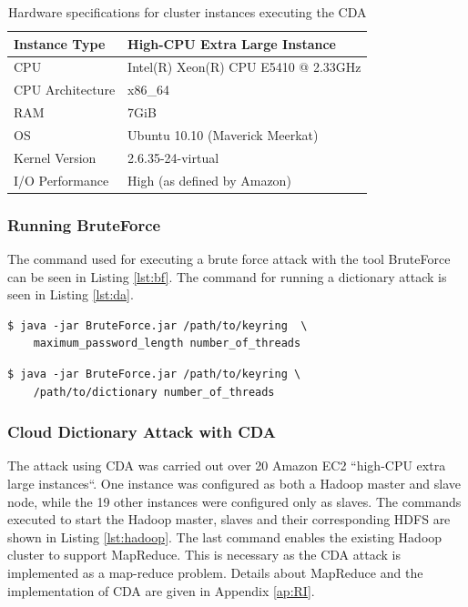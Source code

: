 \documentclass[pdftex,english,10pt,b5paper,twoside]{book}
\begin{document}
\begin{table}[!h]
    \centering
    \caption{Hardware specifications for cluster instances executing the
    \ac{CDA}}
    \label{tab:hwcda}
    \begin{tabular}{| l | l |}
	\hline
	Instance Type       &High-CPU Extra Large Instance\\
	\hline
	CPU		            &Intel(R) Xeon(R) CPU E5410 @ 2.33GHz\\
	\hline
	CPU Architecture    &x86\_64\\
	\hline
	RAM		            &7GiB\\
	\hline
	OS		            &Ubuntu 10.10 (Maverick Meerkat)\\
	\hline
	Kernel Version	    &2.6.35-24-virtual\\
	\hline
	I/O Performance	    &High (as defined by Amazon)\\
	\hline
    \end{tabular}
\end{table}

\subsubsection{Running BruteForce}
The command used for executing a brute force attack with the tool BruteForce
can be seen in Listing \ref{lst:bf}. The command for running a dictionary
attack is seen in Listing \ref{lst:da}. 

\lstset{label=lst:bf, caption=Running local brute force attack}
\begin{lstlisting}
$ java -jar BruteForce.jar /path/to/keyring  \
    maximum_password_length number_of_threads
\end{lstlisting}

\lstset{label=lst:da, caption=Running local dictionary attack}
\begin{lstlisting}
$ java -jar BruteForce.jar /path/to/keyring \
    /path/to/dictionary number_of_threads
\end{lstlisting}

\subsubsection{Cloud Dictionary Attack with \ac{CDA}} The attack using \ac{CDA}
was carried out over 20 Amazon EC2 ``high-CPU extra large instances``. One
instance was configured as both a Hadoop master and slave node, while the 19
other instances were configured only as slaves. The commands executed to start
the Hadoop master, slaves and their corresponding \ac{HDFS} are shown in
Listing \ref{lst:hadoop}. The last command enables the existing Hadoop cluster
to support MapReduce. This is necessary as the \ac{CDA} attack is implemented
as a map-reduce problem. Details about MapReduce and the implementation of
\ac{CDA} are given in Appendix \ref{ap:RI}.\\
\end{document}
